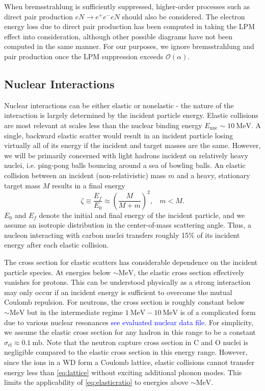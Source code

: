 \documentclass[twocolumn,showpacs,preprintnumbers,amsmath,amssymb,prd]{revtex4}
\newcommand{\OO}{\mathcal{O}}
\def\r{\right)}
\def\l{\left(}
\begin{document}
\begin{appendices}
When bremsstrahlung is sufficiently suppressed, higher-order processes such as direct pair production $e N \rightarrow e^+ e^- e N$ should also be considered. The electron energy loss due to direct pair production has been computed in \cite{Gerhardt:2010bj} taking the LPM effect into consideration, although other possible diagrams have not been computed in the same manner. For our purposes, we ignore bremsstrahlung and pair production once the LPM suppression exceeds $\OO(\alpha)$. 

\subsection*{Nuclear Interactions}
Nuclear interactions can be either elastic or nonelastic - the nature of the interaction is largely determined by the incident particle energy. Elastic collisions are most relevant at scales less than the nuclear binding energy $E_\text{nuc} \sim 10 ~\text{MeV}$. A single, backward elastic scatter would result in an incident particle losing virtually all of its energy if the incident and target masses are the same. However, we will be primarily concerned with light hadrons incident on relatively heavy nuclei, i.e. ping-pong balls bouncing around a sea of bowling balls.
An elastic collision between an incident (non-relativistic) mass $m$ and a heavy, stationary target mass $M$ results in a final energy
\begin{equation}
\label{eq:elasticratio}
\zeta \equiv \frac{E_f}{E_0} \approx \l \frac{M}{M+m} \r^2, ~~~~ m < M.
\end{equation}
$E_0$ and $E_f$ denote the initial and final energy of the incident particle, and we assume an isotropic distribution in the center-of-mass scattering angle. Thus, a nucleon interacting with carbon nuclei transfers roughly 15\% of its incident energy after each elastic collision.

The cross section for elastic scatters has considerable dependence on the incident particle species. At energies below $\sim \text{MeV}$, the elastic cross section effectively vanishes for  protons. This can be understood physically as a strong interaction may only occur if an incident energy is sufficient to overcome the mutual Coulomb repulsion. For neutrons, the cross section is roughly constant below $\sim \text{MeV}$ but in the intermediate regime $1 ~\text{MeV} - \text{10} ~\text{MeV}$ is of a complicated form due to various nuclear resonances \textcolor{blue}{see evaluated nuclear data file}. For simplicity, we assume the elastic cross section for any hadron in this range to be a constant $\sigma_\text{el} \approx 0.1 ~\text{mb}$. Note that the neutron capture cross section in C and O nuclei is negligible compared to the elastic cross section in this energy range. However, since the ions in a WD form a Coulomb lattice, elastic collisions cannot transfer energy less than \eqref{eq:lattice} without exciting additional phonon modes. This limits the applicability of \eqref{eq:elasticratio} to energies above $\sim \text{MeV}$.


\end{appendices}
\end{document}
